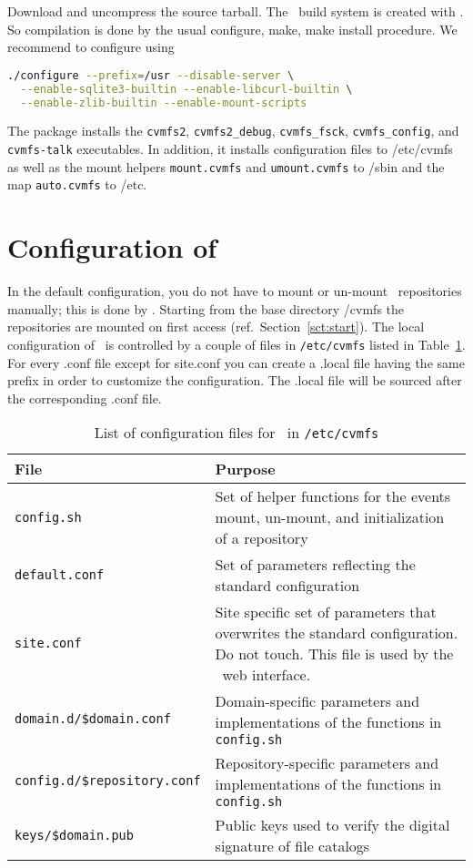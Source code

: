 Download and uncompress the source tarball.
The \cvmfs\ build system is created with .
So compilation is done by the usual configure, make, make install procedure.
We recommend to configure using
\begin{lstlisting}[language=bash]
./configure --prefix=/usr --disable-server \
  --enable-sqlite3-builtin --enable-libcurl-builtin \
  --enable-zlib-builtin --enable-mount-scripts
\end{lstlisting}
The package installs the \texttt{cvmfs2}, \texttt{cvmfs2\_debug}, \texttt{cvmfs\_fsck}, \texttt{cvmfs\_config}, and \texttt{cvmfs-talk} executables.
In addition, it installs configuration files to /etc/cvmfs as well as the mount helpers \texttt{mount.cvmfs} and \texttt{umount.cvmfs} to /sbin and the  map \texttt{auto.cvmfs} to /etc.


\section{Configuration of \cvmfs}

In the default configuration, you do not have to mount or un-mount \cvmfs\ repositories manually; this is done by .
Starting from the base directory /cvmfs the repositories are mounted on first access (ref.~Section~\ref{sct:start}).
The local configuration of \cvmfs\ is controlled by a couple of files in \texttt{/etc/cvmfs} listed in Table~\ref{tbl:configfiles}.
For every .conf file except for site.conf you can create a .local file having the same prefix in order to customize the configuration.
The .local file will be sourced after the corresponding .conf file.
\begin{table}
	\begin{center}
		\begin{tabularx}{\linewidth}{l|X}
			{\bf\centering File} & {\bf\centering Purpose} \\\hline
			\texttt{config.sh} & Set of helper functions for the events mount, un-mount, and initialization of a repository \\
			\texttt{default.conf} & Set of parameters reflecting the standard configuration \\
			\texttt{site.conf} & Site specific set of parameters that overwrites the standard configuration.  Do not touch.  This file is used by the \cernvm\ web interface. \\
			\texttt{domain.d/\$domain.conf} & Domain-specific parameters and implementations of the functions in \texttt{config.sh} \\
			\texttt{config.d/\$repository.conf} & Repository-specific parameters and implementations of the functions in \texttt{config.sh} \\
			\texttt{keys/\$domain.pub} & Public keys used to verify the digital signature of file catalogs \\
		\end{tabularx}
	\end{center}
	\caption{List of configuration files for \cvmfs\ in \texttt{/etc/cvmfs}}
	\label{tbl:configfiles}
\end{table}


